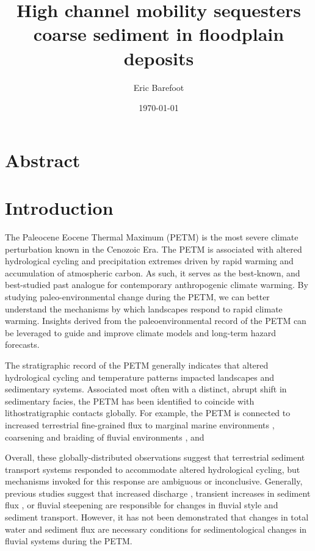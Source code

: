 \documentclass[draft]{compact_proposal}
\title{High channel mobility sequesters coarse sediment in floodplain deposits}
\author{Eric Barefoot}
\date{\today}
\begin{document}
\maketitle


\section{Abstract}

\section{Introduction}


The Paleocene Eocene Thermal Maximum (PETM) is the most severe climate perturbation known in the Cenozoic Era.
The PETM is associated with altered hydrological cycling and precipitation extremes driven by rapid warming and accumulation of atmospheric carbon.
As such, it serves as the best-known, and best-studied past analogue for contemporary anthropogenic climate warming.
By studying paleo-environmental change during the PETM, we can better understand the mechanisms by which landscapes respond to rapid climate warming.
Insights derived from the paleoenvironmental record of the PETM can be leveraged to guide and improve climate models and long-term hazard forecasts.

The stratigraphic record of the PETM generally indicates that altered hydrological cycling and temperature patterns impacted landscapes and sedimentary systems.
Associated most often with a distinct, abrupt shift in sedimentary facies, the PETM has been identified to coincide with lithostratigraphic contacts globally.
For example, the PETM is connected to increased terrestrial fine-grained flux to marginal marine environments \cnote[miller], coarsening and braiding of fluvial environments \cnote[pujalte], and 

Overall, these globally-distributed observations suggest that terrestrial sediment transport systems responded to accommodate altered hydrological cycling, but mechanisms invoked for this response are ambiguous or inconclusive.
Generally, previous studies suggest that increased discharge , transient increases in sediment flux , or fluvial steepening \cnote[bzf 2014] are responsible for changes in fluvial style and sediment transport.
However, it has not been demonstrated that changes in total water and sediment flux are necessary conditions for sedimentological changes in fluvial systems during the PETM.
\end{document}
